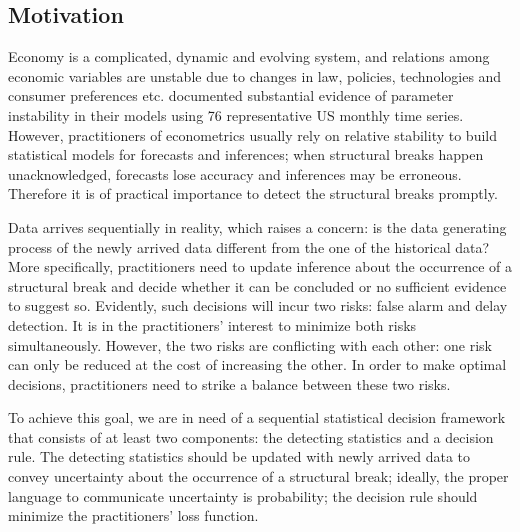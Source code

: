 \documentclass[preprint,authoryear,12pt,english]{elsarticle}
\theoremstyle{plain}
\begin{document}
\subsection{Motivation}
Economy is a complicated, dynamic and evolving system, and relations among economic variables are unstable due to changes in law, policies, technologies and consumer preferences etc. \cite{Stock1996EvidenceRelations} documented substantial evidence of parameter instability in their models using 76 representative US monthly time series. However, practitioners of econometrics usually rely on relative stability to build statistical models for forecasts and inferences; when structural breaks happen unacknowledged, forecasts lose accuracy and inferences may be erroneous. Therefore it is of practical importance to detect the structural breaks promptly.

Data arrives sequentially in reality, which raises a concern: is the data generating process of the newly arrived data different from the one of the historical data? More specifically, practitioners need to update inference about the occurrence of a structural break and decide whether it can be concluded or no sufficient evidence to suggest so. Evidently, such decisions will incur two risks: false alarm and delay detection. It is in the practitioners' interest to minimize both risks simultaneously. However, the two risks are conflicting with each other: one risk can only be reduced at the cost of increasing the other. In order to make optimal decisions, practitioners need to strike a balance between these two risks.

To achieve this goal, we are in need of a sequential statistical decision framework that consists of at least two components: the detecting statistics and a decision rule. The detecting statistics should be updated with newly arrived data to convey uncertainty about the occurrence of a structural break; ideally, the proper language to communicate uncertainty is probability; the decision rule should minimize the practitioners' loss function.
\end{document}
